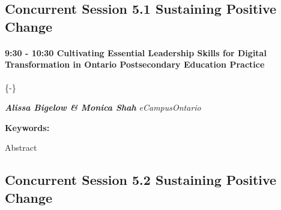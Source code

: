 \documentclass[
]{book}
\begin{document}
\hypertarget{concurrent-session-5.1-sustaining-positive-change}{%
\subsection*{Concurrent Session 5.1 \textbar{} Sustaining Positive Change}\label{concurrent-session-5.1-sustaining-positive-change}}

\begin{session}
\hypertarget{cultivating-essential-leadership-skills-for-digital-transformation-in-ontario-postsecondary-education-practice}{%
\paragraph{\texorpdfstring{9:30 - 10:30 \textbar{} \textbf{Cultivating
Essential Leadership Skills for Digital Transformation in Ontario
Postsecondary Education} \textbar{}
Practice}{9:30 - 10:30 \textbar{} Cultivating Essential Leadership Skills for Digital Transformation in Ontario Postsecondary Education \textbar{} Practice}}\label{cultivating-essential-leadership-skills-for-digital-transformation-in-ontario-postsecondary-education-practice}}

\{-\}

\textbf{\emph{Alissa Bigelow \& Monica Shah}} \textbar{}
\emph{eCampusOntario}

\textbf{Keywords:}

Abstract
\end{session}

\hypertarget{concurrent-session-5.2-sustaining-positive-change}{%
\subsection*{Concurrent Session 5.2 \textbar{} Sustaining Positive Change}\label{concurrent-session-5.2-sustaining-positive-change}}
\end{document}
